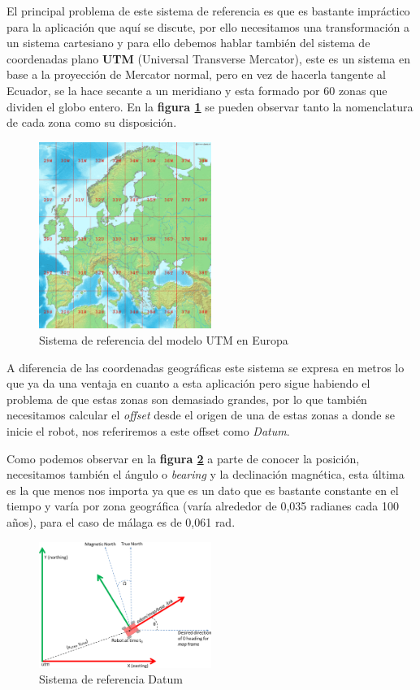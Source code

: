 El principal problema de este sistema de referencia es que es bastante impráctico para la aplicación que aquí se discute, por ello 
necesitamos una transformación a un sistema cartesiano y para ello debemos hablar también del sistema de coordenadas plano \textbf{UTM} 
(Universal Transverse Mercator), este es un sistema en base a la proyección de Mercator normal, pero en vez de hacerla tangente al Ecuador, 
se la hace secante a un meridiano y esta formado por 60 zonas que dividen el globo entero. En la \textbf{figura \ref{fig:utm_europa}} se 
pueden observar tanto la nomenclatura de cada zona como su disposición.

\begin{figure}[h]
    \centering
    \includegraphics[width=0.5\textwidth]{images/europe_utm.png}
    \caption{Sistema de referencia del modelo UTM en Europa}
    \label{fig:utm_europa}
\end{figure}


A diferencia de las coordenadas geográficas este sistema se expresa en metros lo que ya da una ventaja en cuanto a esta aplicación pero 
sigue habiendo el problema de que estas zonas son demasiado grandes, por lo que también necesitamos calcular el \textit{offset} desde el 
origen de una de estas zonas a donde se inicie el robot, nos referiremos a este offset como \textit{Datum}.

Como podemos observar en la \textbf{figura \ref{fig:datum}} a parte de conocer la posición, necesitamos también el ángulo o \textit{bearing} 
y la declinación magnética, esta última es la que menos nos importa ya que es un dato que es bastante constante en el tiempo y varía por 
zona geográfica (varía alrededor de 0,035 radianes cada 100 años), para el caso de málaga es de 0,061 rad.



\begin{figure}[h]
    \centering
    \includegraphics[width=0.5\textwidth]{images/navsat_transform.png}
    \caption{Sistema de referencia Datum}
    \label{fig:datum}
\end{figure}


